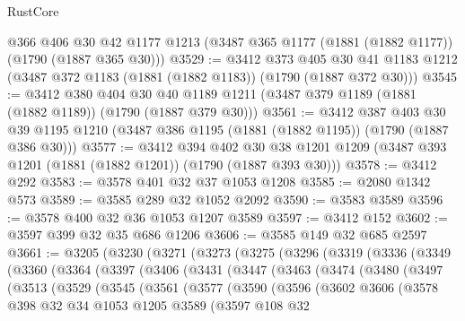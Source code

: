 \begin{lexlean}{RustCore}
\begin{coremodule}
    @366
    @406
    @30
    @42
    @1177
    @1213
    (@3487 @365 @1177 (@1881 (@1882 @1177)) (@1790 (@1887 @365 @30)))
@3529 := @3412
    @373
    @405
    @30
    @41
    @1183
    @1212
    (@3487 @372 @1183 (@1881 (@1882 @1183)) (@1790 (@1887 @372 @30)))
@3545 := @3412
    @380
    @404
    @30
    @40
    @1189
    @1211
    (@3487 @379 @1189 (@1881 (@1882 @1189)) (@1790 (@1887 @379 @30)))
@3561 := @3412
    @387
    @403
    @30
    @39
    @1195
    @1210
    (@3487 @386 @1195 (@1881 (@1882 @1195)) (@1790 (@1887 @386 @30)))
@3577 := @3412
    @394
    @402
    @30
    @38
    @1201
    @1209
    (@3487 @393 @1201 (@1881 (@1882 @1201)) (@1790 (@1887 @393 @30)))
@3578 := @3412 @292
@3583 := @3578 @401 @32 @37 @1053 @1208
@3585 := @2080 @1342 @573
@3589 := @3585 @289 @32 @1052 @2092
@3590 := @3583 @3589
@3596 := @3578 @400 @32 @36 @1053 @1207 @3589
@3597 := @3412 @152
@3602 := @3597 @399 @32 @35 @686 @1206
@3606 := @3585 @149 @32 @685 @2597
@3661 := @3205
    (@3230
      (@3271
        (@3273
          (@3275
            (@3296
              (@3319
                (@3336
                  (@3349
                    (@3360
                      (@3364
                        (@3397
                          (@3406
                            (@3431
                              (@3447
                                (@3463
                                  (@3474
                                    (@3480
                                      (@3497
                                        (@3513
                                          (@3529
                                            (@3545
                                              (@3561
                                                (@3577
                                                  (@3590
                                                    (@3596
                                                      (@3602
                                                        @3606
                                                        (@3578
                                                          @398
                                                          @32
                                                          @34
                                                          @1053
                                                          @1205
                                                          @3589
                                                          (@3597
                                                            @108
                                                            @32

\end{coremodule}
\end{lexlean}
